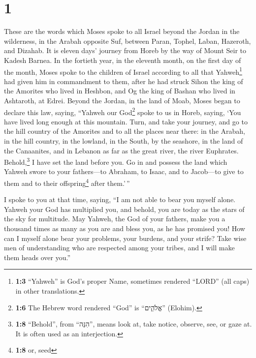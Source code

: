 \hypertarget{section}{%
\section{1}\label{section}}

 These are the words which Moses spoke to all Israel
beyond the Jordan in the wilderness, in the Arabah opposite Suf, between
Paran, Tophel, Laban, Hazeroth, and Dizahab.  It is eleven
days' journey from Horeb by the way of Mount Seir to Kadesh Barnea.
 In the fortieth year, in the eleventh month, on the first
day of the month, Moses spoke to the children of Israel according to all
that Yahweh\footnote{\textbf{1:3} ``Yahweh'' is God's proper Name,
  sometimes rendered ``LORD'' (all caps) in other translations.} had
given him in commandment to them,  after he had struck
Sihon the king of the Amorites who lived in Heshbon, and Og the king of
Bashan who lived in Ashtaroth, at Edrei.  Beyond the
Jordan, in the land of Moab, Moses began to declare this law, saying,
 ``Yahweh our God\footnote{\textbf{1:6} The Hebrew word
  rendered ``God'' is ``אֱלֹהִ֑ים'' (Elohim).} spoke to us in Horeb,
saying, `You have lived long enough at this mountain. 
Turn, and take your journey, and go to the hill country of the Amorites
and to all the places near there: in the Arabah, in the hill country, in
the lowland, in the South, by the seashore, in the land of the
Canaanites, and in Lebanon as far as the great river, the river
Euphrates.  Behold,\footnote{\textbf{1:8} ``Behold'', from
  ``הִנֵּה'', means look at, take notice, observe, see, or gaze at. It
  is often used as an interjection.} I have set the land before you. Go
in and possess the land which Yahweh swore to your fathers---to Abraham,
to Isaac, and to Jacob---to give to them and to their
offspring\footnote{\textbf{1:8} or, seed} after them.'\,''

 I spoke to you at that time, saying, ``I am not able to
bear you myself alone.  Yahweh your God has multiplied
you, and behold, you are today as the stars of the sky for multitude.
 May Yahweh, the God of your fathers, make you a thousand
times as many as you are and bless you, as he has promised you!
 How can I myself alone bear your problems, your burdens,
and your strife?  Take wise men of understanding who are
respected among your tribes, and I will make them heads over you.''

